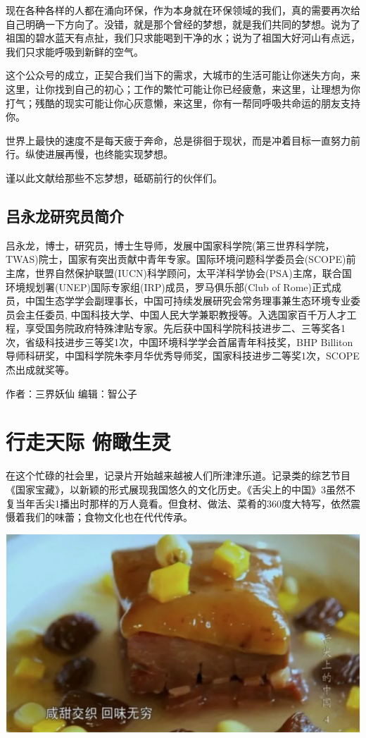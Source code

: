 \documentclass[]{book}
\begin{document}
现在各种各样的人都在涌向环保，作为本身就在环保领域的我们，真的需要再次给自己明确一下方向了。没错，就是那个曾经的梦想，就是我们共同的梦想。说为了祖国的碧水蓝天有点扯，我们只求能喝到干净的水；说为了祖国大好河山有点远，我们只求能呼吸到新鲜的空气。

这个公众号的成立，正契合我们当下的需求，大城市的生活可能让你迷失方向，来这里，让你找到自己的初心；工作的繁忙可能让你已经疲惫，来这里，让理想为你打气；残酷的现实可能让你心灰意懒，来这里，你有一帮同呼吸共命运的朋友支持你。

世界上最快的速度不是每天疲于奔命，总是徘徊于现状，而是冲着目标一直努力前行。纵使进展再慢，也终能实现梦想。

谨以此文献给那些不忘梦想，砥砺前行的伙伴们。

\hypertarget{ux5415ux6c38ux9f99ux7814ux7a76ux5458ux7b80ux4ecb}{%
\subsection{吕永龙研究员简介}\label{ux5415ux6c38ux9f99ux7814ux7a76ux5458ux7b80ux4ecb}}

吕永龙，博士，研究员，博士生导师，发展中国家科学院(第三世界科学院，TWAS)院士，国家有突出贡献中青年专家。国际环境问题科学委员会(SCOPE)前主席，世界自然保护联盟(IUCN)科学顾问，太平洋科学协会(PSA)主席，联合国环境规划署(UNEP)国际专家组(IRP)成员，罗马俱乐部(Club of Rome)正式成员，中国生态学学会副理事长，中国可持续发展研究会常务理事兼生态环境专业委员会主任委员, 中国科技大学、中国人民大学兼职教授等。入选国家百千万人才工程，享受国务院政府特殊津贴专家。先后获中国科学院科技进步二、三等奖各1次，省级科技进步三等奖1次，中国环境科学学会首届青年科技奖，BHP Billiton导师科研奖，中国科学院朱李月华优秀导师奖，国家科技进步二等奖1次，SCOPE杰出成就奖等。

作者：三界妖仙
编辑：智公子

\hypertarget{ux884cux8d70ux5929ux9645-ux4fefux77b0ux751fux7075}{%
\section{行走天际 俯瞰生灵}\label{ux884cux8d70ux5929ux9645-ux4fefux77b0ux751fux7075}}

在这个忙碌的社会里，记录片开始越来越被人们所津津乐道。记录类的综艺节目《国家宝藏》，以新颖的形式展现我国悠久的文化历史。《舌尖上的中国》3虽然不复当年舌尖1播出时那样的万人竟看。但食材、做法、菜肴的360度大特写，依然震慑着我们的味蕾；食物文化也在代代传承。

\includegraphics[width=8.33in]{images/xf1}
\end{document}
